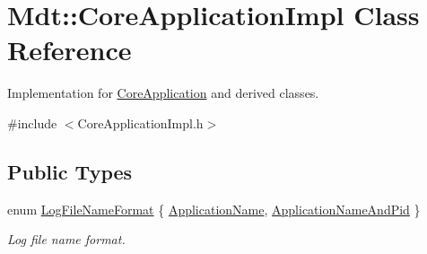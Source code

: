\hypertarget{class_mdt_1_1_core_application_impl}{}\section{Mdt\+:\+:Core\+Application\+Impl Class Reference}
\label{class_mdt_1_1_core_application_impl}


Implementation for \hyperlink{class_mdt_1_1_core_application}{Core\+Application} and derived classes.  




{\ttfamily \#include $<$Core\+Application\+Impl.\+h$>$}

\subsection*{Public Types}
\begin{DoxyCompactItemize}
\item 
enum \hyperlink{class_mdt_1_1_core_application_impl_aa5fed8435e22870a870005ee28ff6221}{Log\+File\+Name\+Format} \{ \hyperlink{class_mdt_1_1_core_application_impl_aa5fed8435e22870a870005ee28ff6221ab47da4311e174cd5978c765033f0060e}{Application\+Name}, 
\hyperlink{class_mdt_1_1_core_application_impl_aa5fed8435e22870a870005ee28ff6221ae817e774fbf9d95b9b720ce7da8e6604}{Application\+Name\+And\+Pid}
 \}\begin{DoxyCompactList}\small\item\em Log file name format. \end{DoxyCompactList}
\end{DoxyCompactItemize}
